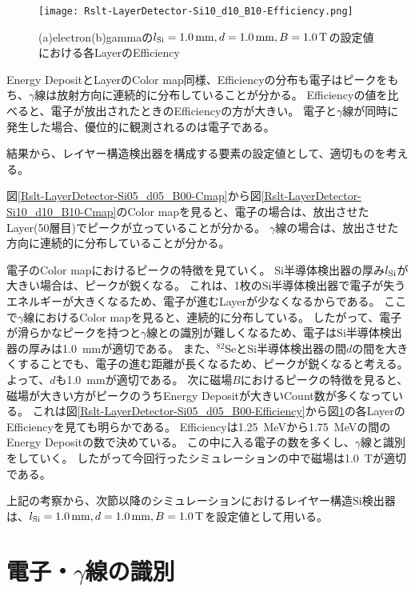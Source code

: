 \documentclass[a4paper,10pt]{jreport}
\begin{document}
\begin{figure}[H]
	\center
	\texttt{[image: Rslt-LayerDetector-Si10\_d10\_B10-Efficiency.png]}
	\caption{(a)electron(b)gammaの$l_{\rm{Si}}=\SI{1.0}{mm}, d=\SI{1.0}{mm}, B=\SI{1.0}{T}$の設定値における各LayerのEfficiency}
	\label{Rslt-LayerDetector-Si10_d10_B10-Efficiency}
\end{figure}

Energy DepositとLayerのColor map同様、Efficiencyの分布も電子はピークをもち、$\gamma$線は放射方向に連続的に分布していることが分かる。
Efficiencyの値を比べると、電子が放出されたときのEfficiencyの方が大きい。
電子と$\gamma$線が同時に発生した場合、優位的に観測されるのは電子である。

結果から、レイヤー構造検出器を構成する要素の設定値として、適切ものを考える。

図\ref{Rslt-LayerDetector-Si05_d05_B00-Cmap}から図\ref{Rslt-LayerDetector-Si10_d10_B10-Cmap}のColor mapを見ると、電子の場合は、放出させたLayer(50層目)でピークが立っていることが分かる。
$\gamma$線の場合は、放出させた方向に連続的に分布していることが分かる。

電子のColor mapにおけるピークの特徴を見ていく。
Si半導体検出器の厚み$l_{\rm{Si}}$が大きい場合は、ピークが鋭くなる。
これは、1枚のSi半導体検出器で電子が失うエネルギーが大きくなるため、電子が進むLayerが少なくなるからである。
ここで$\gamma$線におけるColor mapを見ると、連続的に分布している。
したがって、電子が滑らかなピークを持つと$\gamma$線との識別が難しくなるため、電子はSi半導体検出器の厚みは\SI{1.0}{mm}が適切である。
また、$^{82}$SeとSi半導体検出器の間$d$の間を大きくすることでも、電子の進む距離が長くなるため、ピークが鋭くなると考える。
よって、$d$も\SI{1.0}{mm}が適切である。
次に磁場$B$におけるピークの特徴を見ると、磁場が大きい方がピークのうちEnergy Depositが大きいCount数が多くなっている。
これは図\ref{Rslt-LayerDetector-Si05_d05_B00-Efficiency}から図\ref{Rslt-LayerDetector-Si10_d10_B10-Efficiency}の各LayerのEfficiencyを見ても明らかである。
Efficiencyは\SI{1.25}{MeV}から\SI{1.75}{MeV}の間のEnergy Depositの数で決めている。
この中に入る電子の数を多くし、$\gamma$線と識別をしていく。
したがって今回行ったシミュレーションの中で磁場は\SI{1.0}{T}が適切である。

上記の考察から、次節以降のシミュレーションにおけるレイヤー構造Si検出器は、$l_{\rm{Si}}=\SI{1.0}{mm}, d=\SI{1.0}{mm}, B=\SI{1.0}{T}$を設定値として用いる。




\chapter{電子・$\gamma$線の識別}
\end{document}
